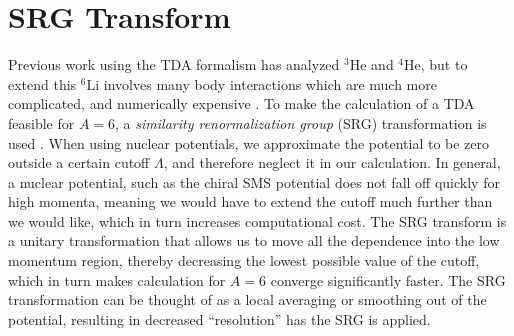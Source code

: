 \documentclass[a4paper,11pt]{article}
\newcommand{\LiS}{{}^{6} \mathrm{Li} }
\newcommand{\HeF}{{}^{4} \mathrm{He}}
\newcommand{\HeT}{{}^{3} \mathrm{He}}
\begin{document}
\section{SRG Transform}
Previous work using the TDA formalism has analyzed
$\HeT$ and $\HeF$, but to extend this $\LiS$ involves many body
interactions which are much more complicated, and numerically expensive
\cite{hammer2020, hammer4He}.
To make the calculation of a TDA feasible for $A=6$, a \textit{similarity renormalization group} (SRG) transformation
is used \cite{SRG}.
When using nuclear potentials, we approximate the potential to be zero 
outside a certain cutoff $\Lambda$, and therefore neglect it in our calculation.
In general, a nuclear potential, such as the chiral SMS potential does
not fall off quickly for high momenta, meaning we would have to
extend the cutoff much further than we would like, which in turn
increases computational cost.
The SRG transform is a unitary transformation that allows us to
move all the dependence into the low momentum region, thereby decreasing the
lowest possible value of the cutoff, which in turn makes
calculation for $A=6$ converge significantly faster.
The SRG transformation can be thought of as a local averaging or
smoothing out of the potential, resulting in decreased ``resolution''
has the SRG is applied.
\end{document}
